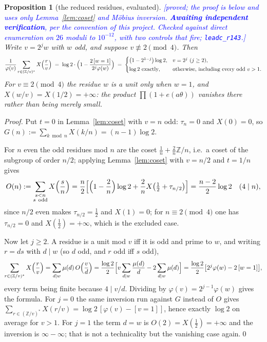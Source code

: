 \documentclass[11pt,a4paper]{article}
\theoremstyle{plain}
\newtheorem{proposition}[theorem]{Proposition}
\theoremstyle{definition}
\theoremstyle{remark}
\newcommand{\STATUS}[1]{\textcolor{blue}{\textsf{[#1]}}}
\begin{document}
\begin{proposition}[the reduced residues, evaluated]\label{prop:redresidue}
\STATUS{proved; the proof is below and uses only Lemma~\ref{lem:coset} and M\"obius inversion.
\textbf{Awaiting independent verification}, per the convention of this project.
Checked against direct enumeration on $26$ moduli to $10^{-12}$, with two controls that fire;
\texttt{leadc\_r143}.}
Write $v=2^{j}w$ with $w$ odd, and suppose $v\not\equiv2\pmod4$. Then
\[
  \frac1{\varphi(v)}\sum_{r\in(\mathbb{Z}/v)^{*}}X\Bigl(\frac rv\Bigr)
  \;=\;\log2\cdot\Bigl(1-\frac{2\,[w=1]}{2^{j}\varphi(w)}\Bigr)
  \;=\;\begin{cases}
    \bigl(1-2^{1-j}\bigr)\log2, & v=2^{j}\ (j\ge2),\\[2pt]
    \log2 \text{ exactly}, & \text{otherwise, including every odd }v>1.
  \end{cases}
\]
For $v\equiv2\pmod4$ the residue $w$ is a unit only when $w=1$, and $X(w/v)=X(1/2)=+\infty$: the
product $\prod(1+e(a\theta))$ vanishes there rather than being merely small.
\end{proposition}

\begin{proof}
Put $t=0$ in Lemma~\ref{lem:coset} with $v=n$ odd: $\tau_n=0$ and $X(0)=0$, so
$G(n):=\sum_{k\bmod n}X(k/n)=(n-1)\log2$.

For $n$ even the odd residues mod $n$ are the coset $\tfrac1n+\tfrac2n\mathbb{Z}/n$, i.e.\ a coset
of the subgroup of order $n/2$; applying Lemma~\ref{lem:coset} with $v=n/2$ and $t=1/n$ gives
\[
  O(n):=\sum_{\substack{s<n\\ s\ \mathrm{odd}}}X\Bigl(\frac sn\Bigr)
  =\frac n2\Bigl[\Bigl(1-\frac2n\Bigr)\log2+\frac2n X\bigl(\tfrac12+\tau_{n/2}\bigr)\Bigr]
  =\frac{n-2}{2}\log2 \quad (4\mid n),
\]
since $n/2$ even makes $\tau_{n/2}=\tfrac12$ and $X(1)=0$; for $n\equiv2\pmod4$ one has
$\tau_{n/2}=0$ and $X(\tfrac12)=+\infty$, which is the excluded case.

Now let $j\ge2$. A residue is a unit mod $v$ iff it is odd and prime to $w$, and writing $r=ds$
with $d\mid w$ (so $d$ odd, and $r$ odd iff $s$ odd),
\[
  \sum_{r\in(\mathbb{Z}/v)^{*}}X\Bigl(\frac rv\Bigr)=\sum_{d\mid w}\mu(d)\,O\Bigl(\frac vd\Bigr)
  =\frac{\log2}{2}\Bigl[v\sum_{d\mid w}\frac{\mu(d)}{d}-2\sum_{d\mid w}\mu(d)\Bigr]
  =\frac{\log2}{2}\bigl[2^{j}\varphi(w)-2\,[w=1]\bigr],
\]
every term being finite because $4\mid v/d$. Dividing by $\varphi(v)=2^{j-1}\varphi(w)$ gives the
formula. For $j=0$ the same inversion run against $G$ instead of $O$ gives
$\sum_{r\in(\mathbb{Z}/v)^{*}}X(r/v)=\log2\,[\varphi(v)-[v=1]]$, hence exactly $\log2$ on average
for $v>1$. For $j=1$ the term $d=w$ is $O(2)=X(\tfrac12)=+\infty$ and the inversion is
$\infty-\infty$; that is not a technicality but the vanishing case again.\qed
\end{proof}
\end{document}
